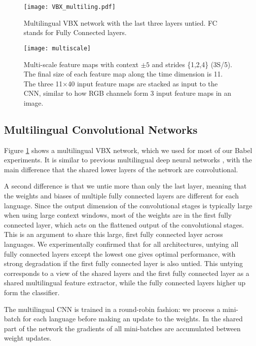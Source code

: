 \documentclass{article}
\begin{document}
\begin{figure}[htp]
    \centering
    \texttt{[image: VBX\_multiling.pdf]}
    \caption{Multilingual VBX network with the last three layers untied. FC stands for Fully Connected layers.}
    \label{fig:multiling}
\end{figure}

\label{ssec:MS}
\begin{figure}[htp]
    \centering
    \texttt{[image: multiscale]}
    \caption{Multi-scale feature maps with context $\pm5$ and strides \{1,2,4\} (3S/5).
        The final size of each feature map along the time dimension is 11.
    The three 11$\times$40 input feature maps are stacked as input to the CNN, similar to how RGB channels form 
    3 input feature maps in an image.}
    \label{fig:MS_image}
\end{figure}
\subsection{Multilingual Convolutional Networks}
\label{ssec:ML}

Figure \ref{fig:multiling} shows a multilingual VBX network, which we used for
most of our Babel experiments.
It is similar to previous multilingual deep neural networks \cite{scanzio2008use}, 
with the main difference that the shared lower layers of the network are convolutional.

A second difference is that we untie more than only the last layer,
meaning that the weights and biases of multiple fully connected layers are
different for each language.
Since the output dimension of the convolutional stages is typically large when using 
large context windows, most of the weights are
in the first fully connected layer, which acts on the flattened output of the convolutional stages.
This is an argument to share this large, first fully connected layer across languages.
We experimentally confirmed that for all architectures,
untying all fully connected layers except the lowest one gives optimal performance,
with strong degradation if the first fully connected layer is also untied.
This untying corresponds to a view of the shared layers and the first fully connected layer as a shared
multilingual feature extractor, while the fully connected layers higher up form the classifier.

The multilingual CNN is trained in a round-robin fashion:
we process a mini-batch for each language before making an update to the weights.
In the shared part of the network the gradients of all mini-batches are accumulated between weight updates.
\end{document}
